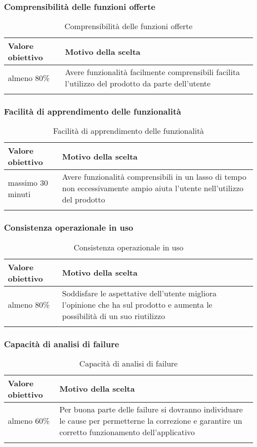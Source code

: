 \documentclass[../PianoDiQualifica_v3.0.0.tex]{subfiles}
\begin{document}
		\subsubsection{Comprensibilità delle funzioni offerte}
			\begin{longtable}[c] { >{\centering\arraybackslash}p{4cm} p{7cm} }
				\toprule
				\centerline{\textbf{Valore obiettivo}} & \centerline{\textbf{Motivo della scelta}} \\
				\midrule
					almeno 80\% & Avere funzionalità facilmente comprensibili facilita l'utilizzo del prodotto da parte dell'utente \\
				\bottomrule
				\caption{Comprensibilità delle funzioni offerte}
			\end{longtable}

		\subsubsection{Facilità di apprendimento delle funzionalità}
			\begin{longtable}[c] { >{\centering\arraybackslash}p{4cm} p{7cm} }
				\toprule
				\centerline{\textbf{Valore obiettivo}} & \centerline{\textbf{Motivo della scelta}} \\
				\midrule
					massimo 30 minuti & Avere funzionalità comprensibili in un lasso di tempo non eccessivamente ampio aiuta l'utente nell'utilizzo del prodotto \\
				\bottomrule
				\caption{Facilità di apprendimento delle funzionalità}
			\end{longtable}

		\subsubsection{Consistenza operazionale in uso}
			\begin{longtable}[c] { >{\centering\arraybackslash}p{4cm} p{7cm} }
				\toprule
				\centerline{\textbf{Valore obiettivo}} & \centerline{\textbf{Motivo della scelta}} \\
				\midrule
					almeno 80\% & Soddisfare le aspettative dell'utente migliora l'opinione che ha sul prodotto e aumenta le possibilità di un suo riutilizzo  \\
				\bottomrule
				\caption{Consistenza operazionale in uso}
			\end{longtable}

		\subsubsection{Capacità di analisi di failure}
			\begin{longtable}[c] { >{\centering\arraybackslash}p{4cm} p{7cm} }
				\toprule
				\centerline{\textbf{Valore obiettivo}} & \centerline{\textbf{Motivo della scelta}} \\
				\midrule
					almeno 60\% & Per buona parte delle failure si dovranno individuare le cause per permetterne la correzione e garantire un corretto funzionamento dell'applicativo  \\
				\bottomrule
				\caption{Capacità di analisi di failure}
			\end{longtable}
\end{document}
